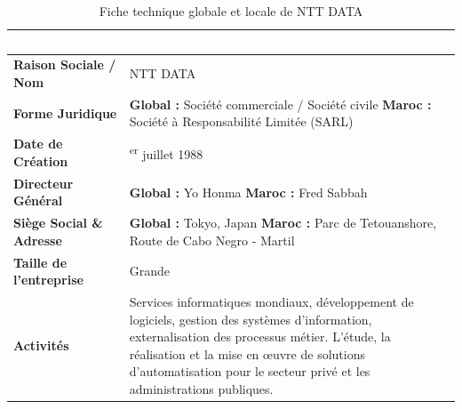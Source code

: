 \documentclass[12pt, a4paper, openany]{report}
\begin{document}
\vspace{-0.2cm}
\begin{table}[H]
    \centering
    \renewcommand{\arraystretch}{1.6} %
    \setlength{\arrayrulewidth}{1pt}
    
    \begin{tabular}{|>{\centering\arraybackslash}p{}|>{\raggedright\arraybackslash}p{}|}
        \hline
        \rowcolor{primaryBlue}
        \textbf{\textcolor{white}{Caractéristique}} & \textbf{\textcolor{white}{Information}} \\
        \hline
        
        \rowcolor{lightBlue}
        \textbf{Raison Sociale / Nom} & NTT DATA \\
        \hline
        
        \textbf{Forme Juridique} & 
        \textbf{Global :} Société commerciale / Société civile \newline 
        \textbf{Maroc :} Société à Responsabilité Limitée (SARL) \\
        \hline
        
        \rowcolor{lightBlue}
        \textbf{Date de Création} & 1\textsuperscript{er} juillet 1988 \\
        \hline
        
        \textbf{Directeur Général} & 
        \textbf{Global :} Yo Honma \newline 
        \textbf{Maroc :} Fred Sabbah \\
        \hline
        
        \rowcolor{lightBlue}
        \textbf{Siège Social \& Adresse} & 
        \textbf{Global :} Tokyo, Japan \newline 
        \textbf{Maroc :} Parc de Tetouanshore, Route de Cabo Negro - Martil \\
        \hline
        
        \textbf{Taille de l'entreprise} & Grande \\
        \hline
        
        \rowcolor{lightBlue}
        \textbf{Activités} & Services informatiques mondiaux, développement de logiciels, gestion des systèmes d'information, externalisation des processus métier. L'étude, la réalisation et la mise en œuvre de solutions d'automatisation pour le secteur privé et les administrations publiques. \\
        \hline
    \end{tabular}
    \vspace{0.0cm}
    \caption{Fiche technique globale et locale de NTT DATA}
    \label{tab:fiche_technique}
\end{table}
\end{document}
